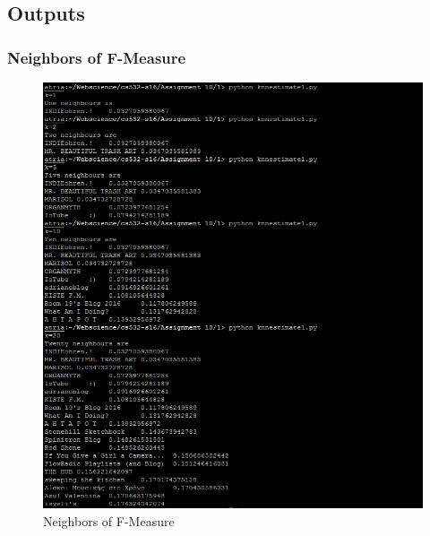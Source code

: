 \subsection{Outputs}

\subsubsection{Neighbors of F-Measure}
\begin{figure}[ht]    
    \begin{center}
        \includegraphics[scale=0.7]{fmeasureneighbours.png}
        \caption{Neighbors of F-Measure}
        \label{Sample2}
    \end{center}
\end{figure}
\newpage

